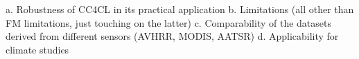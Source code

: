 \label{conclusions}

a. Robustness of CC4CL in its practical application
b. Limitations (all other than FM limitations, just touching on the latter)
c. Comparability of the datasets derived from different sensors (AVHRR, MODIS, AATSR)
d. Applicability for climate studies
